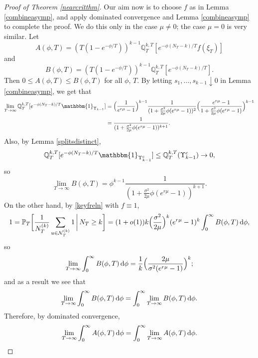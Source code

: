 \documentclass{article}
\theoremstyle{plain}
\theoremstyle{definition}
\newcommand{\Q}{\mathbb{Q}}
\renewcommand{\P}{\mathbb{P}}
\newcommand{\ind}{\mathbbm{1}}
\newcommand{\Nc}{\mathcal{N}}
\renewcommand{\d}{{\rm{d}}}
\begin{document}
\begin{proof}[Proof of Theorem \ref{nearcritthm}]
Our aim now is to choose $f$ as in Lemma \ref{combineasymp}, and apply dominated convergence and Lemma \ref{combineasymp} to complete the proof. We do this only in the case $\mu\neq 0$; the case $\mu=0$ is very similar. Let
\[A(\phi,T) = (T(1-e^{-\phi/T}))^{k-1} \Q^{k,T}_T[e^{-\phi(N_T-k)/T}f(\xi_T)]\]
and
\[B(\phi,T) = (T(1-e^{-\phi/T}))^{k-1} \Q^{k,T}_T[e^{-\phi(N_T-k)/T}].\]
Then $0\le A(\phi,T)\le B(\phi,T)$ for all $\phi$, $T$. By letting $s_1,\ldots,s_{k-1}\downarrow 0$ in Lemma \ref{combineasymp}, we get that
\begin{align*}
\lim_{T\to\infty} \Q^{k,T}_T[e^{-\phi(N_T-k)/T}\ind_{\Upsilon_{k-1}}] &= \Big(\frac{1}{e^{r\mu}-1}\Big)^{k-1} \frac{1}{(1+\frac{\sigma^2}{2\mu}\phi(e^{r\mu}-1))^2} \Big(\frac{e^{r\mu}-1}{1+\frac{\sigma^2}{2\mu}\phi(e^{r\mu}-1)}\Big)^{k-1}\\
&= \frac{1}{(1+\frac{\sigma^2}{2\mu}\phi(e^{r\mu}-1))^{k+1}}.
\end{align*}
Also, by Lemma \ref{splitsdistinct},
\[\Q^{k,T}_T[e^{-\phi(N_T-k)/T}\ind_{\Upsilon_{k-1}^c}] \le \Q^{k,T}_T(\Upsilon_{k-1}^c) \to 0,\]
so
\[\lim_{T\to\infty} B(\phi,T) = \phi^{k-1} \frac{1}{(1+\frac{\sigma^2}{2\mu}\phi(e^{r\mu}-1))^{k+1}}.\]
On the other hand, by \eqref{keyfreln} with $f\equiv 1$,
\[1 = \P_T\bigg[\frac{1}{N_T^{(k)}} \sum_{u\in \Nc_T^{(k)}} 1 \, \bigg| \, N_T \ge k\bigg] = (1+o(1))k\Big(\frac{\sigma^2}{2\mu}\Big)^k(e^{r\mu}-1)^k \int_0^\infty B(\phi,T)\, \d\phi,\]
so
\[\lim_{T\to\infty}\int_0^\infty B(\phi,T)\, \d\phi = \frac{1}{k}\Big(\frac{2\mu}{\sigma^2(e^{r\mu}-1)}\Big)^k;\]
and as a result we see that
\[\lim_{T\to\infty}\int_0^\infty B(\phi,T)\, \d\phi = \int_0^\infty \lim_{T\to\infty} B(\phi,T)\,\d\phi.\]
Therefore, by dominated convergence,
\begin{equation}\label{domcon}
\lim_{T\to\infty}\int_0^\infty A(\phi,T)\, \d\phi = \int_0^\infty \lim_{T\to\infty} A(\phi,T)\,\d\phi.
\end{equation}


\end{proof}
\end{document}
